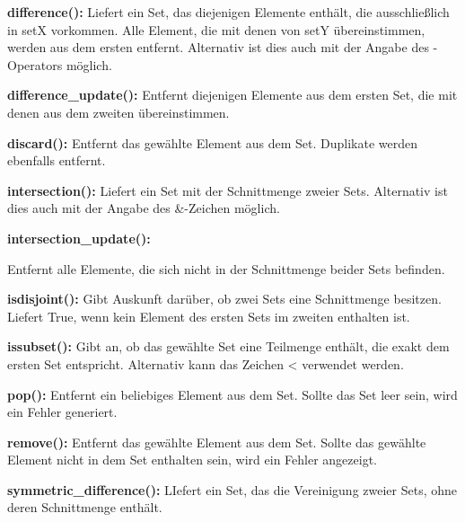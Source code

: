 \textbf{difference():}
Liefert ein Set, das diejenigen Elemente enthält, die ausschließlich in setX vorkommen. Alle Element, die mit denen von setY übereinstimmen, werden aus dem ersten entfernt. Alternativ ist dies auch mit der Angabe des  \glqq{}-\grqq{} Operators möglich.

    
\textbf{difference_update():}
Entfernt diejenigen Elemente aus dem ersten Set, die mit denen aus dem zweiten übereinstimmen.

    
\textbf{discard():}
Entfernt das gewählte Element aus dem Set. Duplikate werden ebenfalls entfernt.


\textbf{intersection():}
Liefert ein Set mit der Schnittmenge zweier Sets. Alternativ ist dies auch mit der Angabe des \glqq{}&\grqq{}-Zeichen möglich.


\textbf{intersection_update():}

Entfernt alle Elemente, die sich nicht in der Schnittmenge beider Sets befinden.
    
\textbf{isdisjoint():}
Gibt Auskunft darüber, ob zwei Sets eine Schnittmenge besitzen. Liefert \glqq{}True\grqq{}, wenn kein Element des ersten Sets im zweiten enthalten ist.

    
\textbf{issubset():}
Gibt an, ob das gewählte Set eine Teilmenge enthält, die exakt dem ersten Set entspricht. Alternativ kann das Zeichen \glqq{}<\grqq{} verwendet werden.

    
\textbf{pop():}
Entfernt ein beliebiges Element aus dem Set. Sollte das Set leer sein, wird ein Fehler generiert.

    
\textbf{remove():}
Entfernt das gewählte Element aus dem Set. Sollte das gewählte Element nicht in dem Set enthalten sein, wird ein Fehler angezeigt.

    
\textbf{symmetric_difference():}
LIefert ein Set, das die Vereinigung zweier Sets, ohne deren Schnittmenge enthält.

    
